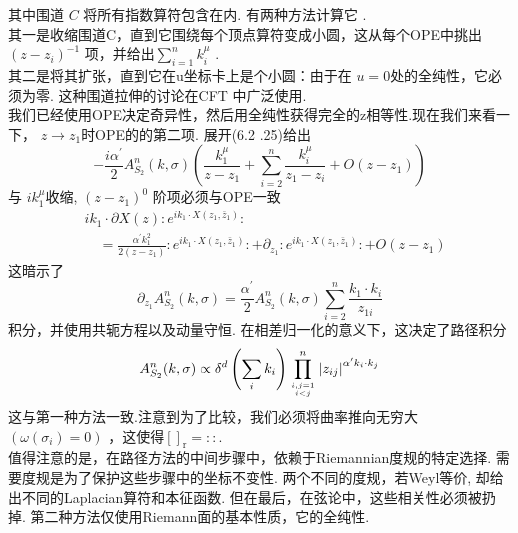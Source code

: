 其中围道 $C$ 将所有指数算符包含在内. 有两种方法计算它 . \\
其一是收缩围道C，直到它围绕每个顶点算符变成小圆，这从每个OPE中挑出 $\left(z-z_{i}\right)^{-1}$ 项，并给出$\sum_{i=1}^{n} k_{i}^{\mu} $ .\\
其二是将其扩张，直到它在u坐标卡上是个小圆：由于在 $u=0$处的全纯性，它必须为零. 这种围道拉伸的讨论在CFT 中广泛使用. \\
我们已经使用OPE决定奇异性，然后用全纯性获得完全的z相等性.现在我们来看一下，  $z \rightarrow z_{1}$时OPE的的第二项. 展开(6.2 .25)给出
\begin{equation}
	-\frac{i \alpha^{\prime}}{2} A_{S_{2}}^{n}(k, \sigma)\left(\frac{k_{1}^{\mu}}{z-z_{1}}+\sum_{i=2}^{n} \frac{k_{i}^{\mu}}{z_{1}-z_{i}}+O\left(z-z_{1}\right)\right)
\end{equation}
与 $i k_{1}^{\mu}$收缩,  $\left(z-z_{1}\right)^{0}$ 阶项必须与OPE一致
\begin{equation}
	\begin{aligned}
		&i k_{1} \cdot \partial X(z): e^{i k_{1} \cdot X\left(z_{1}, \bar{z}_{1}\right)}: \\
		&\quad=\frac{\alpha^{\prime} k_{1}^{2}}{2\left(z-z_{1}\right)}: e^{i k_{1} \cdot X\left(z_{1}, \bar{z}_{1}\right)}:+\partial_{z_{1}}: e^{i k_{1} \cdot X\left(z_{1}, \bar{z}_{1}\right)}:+O\left(z-z_{1}\right)
	\end{aligned}
\end{equation}
这暗示了
\begin{equation}
	\partial_{z_{1}} A_{S_{2}}^{n}(k, \sigma)=\frac{\alpha^{\prime}}{2} A_{S_{2}}^{n}(k, \sigma) \sum_{i=2}^{n} \frac{k_{1} \cdot k_{i}}{z_{1 i}}
\end{equation}
积分，并使用共轭方程以及动量守恒. 在相差归一化的意义下，这决定了路径积分
\begin{equation}
	A_{S_{2}}^{n}(k, \sigma) \propto \delta^{d}\left(\sum_{i} k_{i}\right) \prod_{i, j=1 \atop i<j}^{n}\left|z_{i j}\right|^{\alpha^{\prime} k_{i} \cdot k_{j}}
\end{equation}
这与第一种方法一致.注意到为了比较，我们必须将曲率推向无穷大  $\left(\omega\left(\sigma_{i}\right)=0\right)$ ，这使得$[]_{\mathrm{r}}=::$.\\
值得注意的是，在路径方法的中间步骤中，依赖于Riemannian度规的特定选择. 需要度规是为了保护这些步骤中的坐标不变性. 两个不同的度规，若Weyl等价, 却给出不同的Laplacian算符和本征函数. 但在最后，在弦论中，这些相关性必须被扔掉. 第二种方法仅使用Riemann面的基本性质，它的全纯性.\\

